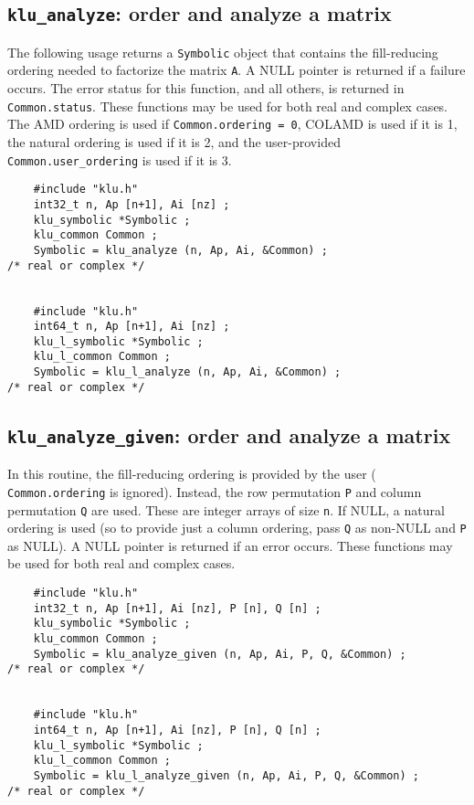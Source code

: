 \documentclass[11pt]{article}
\begin{document}
\subsection{{\tt klu\_analyze}: order and analyze a matrix}

The following usage returns a {\tt Symbolic} object that contains the
fill-reducing ordering needed to factorize the matrix {\tt A}.  A NULL pointer
is returned if a failure occurs.  The error status for this function, and all
others, is returned in {\tt Common.status}.  These functions may be used for
both real and complex cases.  The AMD ordering is used if {\tt Common.ordering
= 0}, COLAMD is used if it is 1, the natural ordering is used if it is 2, and
the user-provided {\tt Common.user\_ordering} is used if it is 3.

{\footnotesize
\begin{verbatim}
    #include "klu.h"
    int32_t n, Ap [n+1], Ai [nz] ;
    klu_symbolic *Symbolic ;
    klu_common Common ;
    Symbolic = klu_analyze (n, Ap, Ai, &Common) ;                             /* real or complex */


    #include "klu.h"
    int64_t n, Ap [n+1], Ai [nz] ;
    klu_l_symbolic *Symbolic ;
    klu_l_common Common ;
    Symbolic = klu_l_analyze (n, Ap, Ai, &Common) ;                           /* real or complex */
\end{verbatim}
}

\subsection{{\tt klu\_analyze\_given}: order and analyze a matrix}

In this routine, the fill-reducing ordering is provided by the user ({\tt
Common.ordering} is ignored).  Instead, the row permutation {\tt P} and column
permutation {\tt Q} are used.  These are integer arrays of size {\tt n}.  If
NULL, a natural ordering is used (so to provide just a column ordering, pass
{\tt Q} as non-NULL and {\tt P} as NULL).  A NULL pointer is returned if an
error occurs.  These functions may be used for both real and complex cases.

{\footnotesize
\begin{verbatim}
    #include "klu.h"
    int32_t n, Ap [n+1], Ai [nz], P [n], Q [n] ;
    klu_symbolic *Symbolic ;
    klu_common Common ;
    Symbolic = klu_analyze_given (n, Ap, Ai, P, Q, &Common) ;                 /* real or complex */


    #include "klu.h"
    int64_t n, Ap [n+1], Ai [nz], P [n], Q [n] ;
    klu_l_symbolic *Symbolic ;
    klu_l_common Common ;
    Symbolic = klu_l_analyze_given (n, Ap, Ai, P, Q, &Common) ;               /* real or complex */
\end{verbatim}
}
\end{document}
